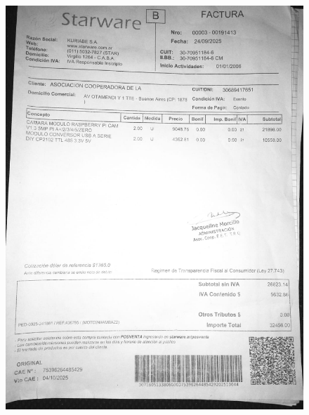 \documentclass[12pt,a4paper]{article}
\begin{document}
\begin{figure}
    \centering
    \includegraphics[width=1\linewidth]{Carpeta de campo/Factura3.png}
\end{figure}
\end{document}

